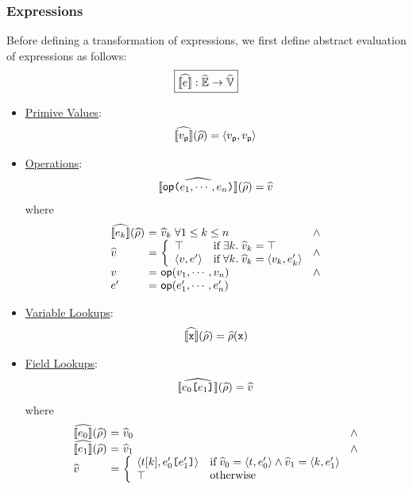 \subsubsection{Expressions} Before defining a transformation of expressions, we
first define abstract evaluation of expressions as follows:
\[
  \framebox{$\asem{\expr}: \aenvset \rightarrow \avalset$}
\]
\begin{itemize}
  \item \underline{Primive Values}:
    \[
      \widehat{\llbracket{v_{\textsf{p}}}\rrbracket}(\widehat{\rho}) = \langle v_{\textsf{p}}, v_{\textsf{p}} \rangle
    \]
  \item \underline{Operations}:
    \[
      \widehat{\llbracket{\textsf{op}\texttt{(}e_1, \cdots, e_n \texttt{)}}\rrbracket}(\widehat{\rho}) = \widehat{v}
    \]
    where
    \[
      \begin{array}{l@{~}c@{~}l@{~}l}
        \asem{\expr_k}(\aenv) &=& \aval_k \; \forall 1 \leq k \leq n
        &\wedge\\
        \aval &=& \left\{
          \begin{array}{ll}
            \top & \text{if} \; \exists k. \; \aval_k = \top\\
            \langle \val, \expr' \rangle & \text{if} \; \forall k. \; \aval_k =
            \langle \val_k, \expr'_k \rangle\\
          \end{array}
        \right. &\wedge\\
        \val &=& \op(\val_1, \cdots, \val_n) &\wedge\\
        \expr' &=& \op(\expr'_1, \cdots, \expr'_n)\\
      \end{array}
    \]
  \item \underline{Variable Lookups}:
    \[
      \widehat{\llbracket{\texttt{x}}\rrbracket}(\widehat{\rho}) = \widehat{\rho}(\texttt{x})
    \]
  \item \underline{Field Lookups}:
    \[
      \widehat{\llbracket{e_0 \texttt{[}e_1 \texttt{]}}\rrbracket}(\widehat{\rho}) = \widehat{v}
    \]
    where
    \[
      \begin{array}{l@{~}c@{~}l@{~}l}
        \asem{\expr_0}(\aenv) &=& \aval_0 &\wedge\\
        \asem{\expr_1}(\aenv) &=& \aval_1 &\wedge\\
        \aval &=& \left\{
          \begin{array}{ll}
            \langle \tree[k], \expr'_0 \kwsl \expr'_1 \kwsr \rangle & \text{if}
            \; \aval_0 = \langle \tree, \expr'_0 \rangle \wedge \aval_1 =
            \langle k, \expr'_1 \rangle\\
            \top & \text{otherwise}\\
          \end{array}
        \right.\\
      \end{array}
    \]
\end{itemize}
